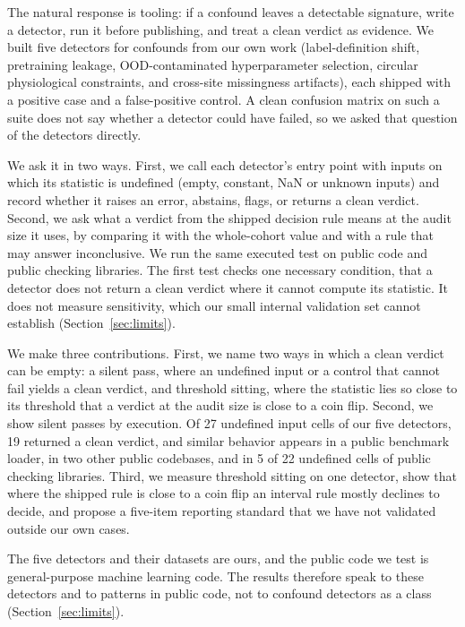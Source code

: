 \documentclass[10pt]{article}
\theoremstyle{definition}
\begin{document}
The natural response is tooling: if a confound leaves a detectable signature, write a detector, run it before publishing, and treat a clean verdict as evidence. We built five detectors for confounds from our own work (label-definition shift, pretraining leakage, OOD-contaminated hyperparameter selection, circular physiological constraints, and cross-site missingness artifacts), each shipped with a positive case and a false-positive control. A clean confusion matrix on such a suite does not say whether a detector could have failed, so we asked that question of the detectors directly.

We ask it in two ways. First, we call each detector's entry point with inputs on which its statistic is undefined (empty, constant, NaN or unknown inputs) and record whether it raises an error, abstains, flags, or returns a clean verdict. Second, we ask what a verdict from the shipped decision rule means at the audit size it uses, by comparing it with the whole-cohort value and with a rule that may answer inconclusive. We run the same executed test on public code and public checking libraries. The first test checks one necessary condition, that a detector does not return a clean verdict where it cannot compute its statistic. It does not measure sensitivity, which our small internal validation set cannot establish (Section~\ref{sec:limits}).

We make three contributions. First, we name two ways in which a clean verdict can be empty: a silent pass, where an undefined input or a control that cannot fail yields a clean verdict, and threshold sitting, where the statistic lies so close to its threshold that a verdict at the audit size is close to a coin flip. Second, we show silent passes by execution. Of 27 undefined input cells of our five detectors, 19 returned a clean verdict, and similar behavior appears in a public benchmark loader, in two other public codebases, and in 5 of 22 undefined cells of public checking libraries. Third, we measure threshold sitting on one detector, show that where the shipped rule is close to a coin flip an interval rule mostly declines to decide, and propose a five-item reporting standard that we have not validated outside our own cases.

The five detectors and their datasets are ours, and the public code we test is general-purpose machine learning code. The results therefore speak to these detectors and to patterns in public code, not to confound detectors as a class (Section~\ref{sec:limits}).
\end{document}
